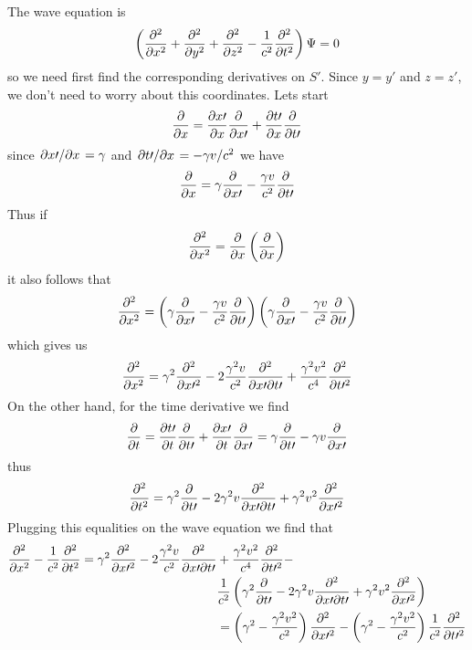 \documentclass[oneside, 10pt, notitlepage]{book}
\begin{document}
The wave equation is
\begin{equation}
\left(\pdv[2]{x} + \pdv[2]{y} + \pdv[2]{z} - \frac{1}{c^2}\pdv[2]{t}\right)\Psi = 0
\end{equation}
so we need first find the corresponding derivatives on \(S{\prime}\). Since \(y=y{\prime}\) and \(z=z{\prime}\), we don't need to worry about this coordinates. Lets start
\begin{equation}\pdv{x} = \pdv{x{\prime}}{x}\pdv{x{\prime}} + \pdv{t{\prime}}{x}\pdv{t{\prime}}  \end{equation}
since \(\pdv*{x{\prime}}{x} = \gamma \) and \(\pdv*{t{\prime}}{x} = -\gamma v/c^2\)
we have
\begin{equation}\pdv{x} = \gamma \pdv{x{\prime}} - \frac{\gamma v}{c^2}\pdv{t{\prime}}\end{equation}
Thus if
\begin{equation}\pdv[2]{x} = \pdv{x} \left(\pdv{x}\right)\end{equation}
it also follows that
\begin{equation}\pdv[2]{x} = \left(\gamma \pdv{x{\prime}} - \frac{\gamma v}{c^2}\pdv{t{\prime}}\right)\left(\gamma \pdv{x{\prime}} - \frac{\gamma v}{c^2}\pdv{t{\prime}}\right)\end{equation}
which gives us
\begin{equation}\pdv[2]{x} = \gamma^2 \pdv[2]{x{\prime}} -2 \frac{\gamma^2 v}{c^2}\pdv{}{x{\prime}}{t{\prime}} +\frac{{\gamma^2} {v^2}}{c^4} \pdv[2]{t{\prime}}\end{equation}
On the other hand, for the time derivative we find
\begin{equation}\pdv{t} = \pdv{t{\prime}}{t}\pdv{t{\prime}} + \pdv{x{\prime}}{t}\pdv{x{\prime}} = \gamma \pdv{t{\prime}} - \gamma v \pdv{x{\prime}}\end{equation}
thus
\begin{equation}\pdv[2]{t} = \gamma^2 \pdv{t{\prime}} - 2 \gamma^2 v \pdv{}{x{\prime}}{t{\prime}} + \gamma^2 v^2 \pdv[2]{x{\prime}}\end{equation}
Plugging this equalities on the wave equation we find that
\begin{equation}
\begin{split}
\pdv[2]{x} - \frac{1}{c^2}\pdv[2]{t}=\gamma^2 \pdv[2]{x{\prime}} -2 \frac{\gamma^2 v}{c^2}\pdv{}{x{\prime}}{t{\prime}} &+\frac{{\gamma^2} {v^2}}{c^4} \pdv[2]{t{\prime}} -\\
& \frac{1}{c^2}\left(\gamma^2 \pdv{t{\prime}} - 2 \gamma^2 v \pdv{}{x{\prime}}{t{\prime}} + \gamma^2 v^2 \pdv[2]{x{\prime}}\right) \\
&= \left(\gamma^2 - \frac{\gamma^2 v^2}{c^2}\right)\pdv[2]{x{\prime}} - \left(\gamma^2 - \frac{\gamma^2 v^2}{c^2}\right)\frac{1}{c^2}\pdv[2]{t{\prime}}
\end{split}
\end{equation}
\end{document}
